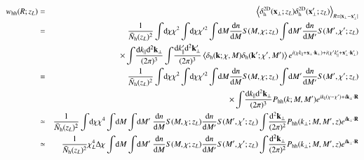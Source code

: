 \documentclass[onecolumn,notitlepage,showpacs,amsmath,amssymb,prd,floatfix]{revtex4-1}
\def\ave#1{\left\langle #1 \right\rangle}
\newcommand{\bx}{{\bf x}}
\newcommand{\bk}{{\bf k}}
\newcommand{\dr}{\mathrm{d}}
\newcommand{\deltah}{\delta_{\mathrm{h}}}
\newcommand{\phh}{P_{\mathrm{hh}}}
\newcommand{\bh}{\mathrm{h}}
\newcommand{\bnh}{\frac{\dr n}{\dr M}}
\begin{document}
\begin{eqnarray}
 w_{\mathrm{hh}}(R;z_L)&=&\ave{\delta^{\rm 2D}_\bh(\bx_\perp;z_L)
  \delta^{\rm 2D}_\bh(\bx'_\perp;z_L)
  }_{R=|\bx_\perp-\bx'_\perp|}\nonumber\\
 &=&\frac{1}{\bar{N}_\bh(z_L)^2}\int\!\dr\chi \chi^2
  \int\!\dr\chi \chi^{\prime 2}
  \int\!\dr M\frac{\dr n}{\dr M}S(M, \chi; z_L)
  \int\!\dr M'\frac{\dr n}{\dr M'}S(M',\chi'; z_L)\nonumber\\
  &&\hspace{2em}\times
  \int\!\frac{\dr k_\parallel \dr^2\bk_\perp}{(2\pi)^3}
  \int\!\frac{\dr k'_\parallel \dr^2\bk'_\perp}{(2\pi)^3}
  \ave{\deltah(\bk;\chi, M)\deltah(\bk';\chi', M')
  }e^{i(\chi k_\parallel+\bx_\perp\cdot\bk_\perp)
  +i(\chi'k'_\parallel+\bx'_\perp\cdot\bk'_\perp)}\nonumber\\
 &=&\frac{1}{\bar{N}_\bh(z_L)^2}\int\!\dr\chi \chi^2
  \int\!\dr\chi \chi^{\prime 2}
  \int\!\dr M\frac{\dr n}{\dr M}S(M, \chi; z_L)
  \int\!\dr M'\frac{\dr n}{\dr M'}S(M',\chi'; z_L)\nonumber\\
  &&\hspace{4em}\times
  \int\!\frac{\dr k_\parallel \dr^2\bk_\perp}{(2\pi)^3}
  \phh(k;M,M')
  e^{ik_\parallel(\chi-\chi')+i\bk_\perp\cdot{\bf R}}\nonumber\\
 &\simeq& \frac{1}{\bar{N}_\bh(z_L)^2}\int\!\dr\chi \chi^4
  \int\!\dr M\int\!\dr M'~\frac{\dr n}{\dr M}S(M, \chi; z_L)
  \frac{\dr n}{\dr M'}S(M',\chi'; z_L)
\int\!\frac{\dr^2\bk_\perp}{(2\pi)^2}
\phh(k_\perp;M,M',z)
  e^{i\bk_\perp\cdot{\bf R}}\nonumber\\
 &\simeq& \frac{1}{\bar{N}_\bh(z_L)^2}\chi_L^4\Delta\chi
  \int\!\dr M\int\!\dr M'~\frac{\dr n}{\dr M}S(M, \chi; z_L)
  \frac{\dr n}{\dr M'}S(M',\chi'; z_L)
\int\!\frac{\dr^2\bk_\perp}{(2\pi)^2}
\phh(k_\perp;M,M',z)
e^{i\bk_\perp\cdot{\bf R}}
\end{eqnarray}
\end{document}
